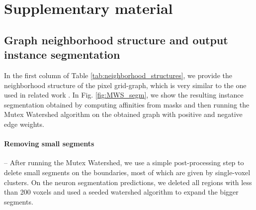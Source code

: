 
\section{Supplementary material}




\subsection{Graph neighborhood structure and output instance segmentation}
In the first column of Table \ref{tab:neighborhood_structures}, we provide the neighborhood structure of the pixel grid-graph, which is very similar to the one used in related work \cite{wolf2018mutex,lee2017superhuman}.
In Fig. \ref{fig:MWS_segm}, we show the resulting instance segmentation obtained by computing affinities from \maskname masks and then running the Mutex Watershed algorithm on the obtained graph with positive and negative edge weights.

\paragraph{Removing small segments} -- After running the Mutex Watershed, we use a simple post-processing step to delete small segments on the boundaries, most of which are given by single-voxel clusters. On the neuron segmentation predictions, we deleted all regions with less than 200 voxels and used a seeded watershed algorithm to expand the bigger segments.



